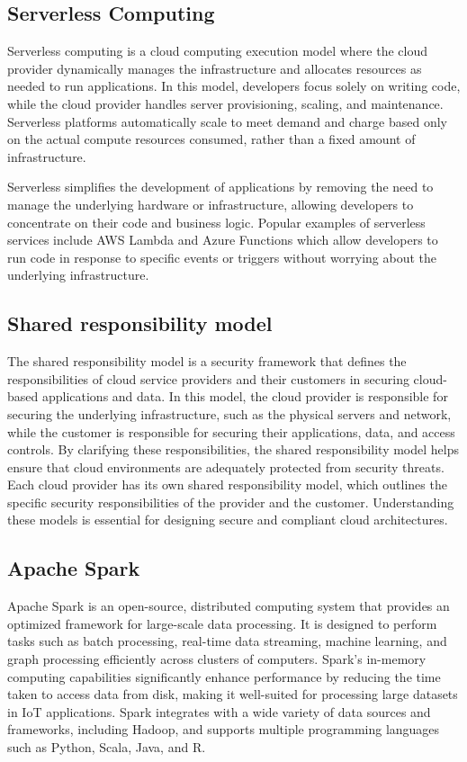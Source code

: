 \subsection*{Serverless Computing}
\label{sec:serverless}
Serverless computing is a cloud computing execution model where the cloud provider dynamically manages the infrastructure and allocates resources as needed to run applications. In this model, developers focus solely on writing code, while the cloud provider handles server provisioning, scaling, and maintenance. Serverless platforms automatically scale to meet demand and charge based only on the actual compute resources consumed, rather than a fixed amount of infrastructure.

Serverless simplifies the development of applications by removing the need to manage the underlying hardware or infrastructure, allowing developers to concentrate on their code and business logic. Popular examples of serverless services include AWS Lambda and Azure Functions which allow developers to run code in response to specific events or triggers without worrying about the underlying infrastructure.


\subsection*{Shared responsibility model}
\label{sec:shared-responsibility-model}
The shared responsibility model is a security framework that defines the responsibilities of cloud service providers and their customers in securing cloud-based applications and data. In this model, the cloud provider is responsible for securing the underlying infrastructure, such as the physical servers and network, while the customer is responsible for securing their applications, data, and access controls. By clarifying these responsibilities, the shared responsibility model helps ensure that cloud environments are adequately protected from security threats.
Each cloud provider has its own shared responsibility model, which outlines the specific security responsibilities of the provider and the customer. Understanding these models is essential for designing secure and compliant cloud architectures.

\subsection*{Apache Spark}
\label{sec:apache-spark}
Apache Spark\cite{site:spark} is an open-source, distributed computing system that provides an optimized framework for large-scale data processing. It is designed to perform tasks such as batch processing, real-time data streaming, machine learning, and graph processing efficiently across clusters of computers. Spark's in-memory computing capabilities significantly enhance performance by reducing the time taken to access data from disk, making it well-suited for processing large datasets in IoT applications. Spark integrates with a wide variety of data sources and frameworks, including Hadoop, and supports multiple programming languages such as Python, Scala, Java, and R.


